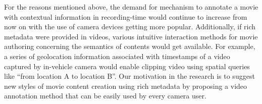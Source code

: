 For the reasons mentioned above, the demand for mechanism to annotate a movie with contextual information in recording-time would continue to increase from now on with the use of camera devices getting more popular.
Additionally, if rich metadata were provided in videos, various intuitive interaction methods for movie authoring concerning the semantics of contents would get available. 
For example, a series of geolocation information associated with timestamps of a video captured by in-vehicle camera would enable clipping video using spatial queries like ``from location A to location B''.
Our motivation in the research is to suggest new styles of movie content creation using rich metadata by proposing a video annotation method that can be easily used by every camera user.
